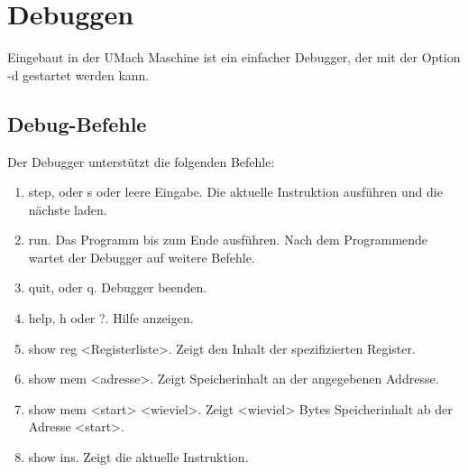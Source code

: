 \section{Debuggen}
\label{sec:debuggen}

Eingebaut in der UMach Maschine ist ein einfacher Debugger, der mit der Option
\glqq{}-d\grqq{} gestartet werden kann. 

\subsection{Debug-Befehle}

Der Debugger unterstützt die folgenden Befehle:

\begin{enumerate}
 \item step, oder s oder leere Eingabe. 
       Die aktuelle Instruktion ausführen und die nächste laden.
 \item run. Das Programm bis zum Ende ausführen. Nach dem Programmende wartet
       der Debugger auf weitere Befehle.
 \item quit, oder q. Debugger beenden.
 \item help, h oder ?. Hilfe anzeigen.
 \item show reg <Registerliste>. Zeigt den Inhalt der spezifizierten Register.
 \item show mem <adresse>. Zeigt Speicherinhalt an der angegebenen Addresse.
 \item show mem <start> <wieviel>. Zeigt <wieviel> Bytes Speicherinhalt ab
       der Adresse <start>.
 \item show ins. Zeigt die aktuelle Instruktion.
\end{enumerate}


